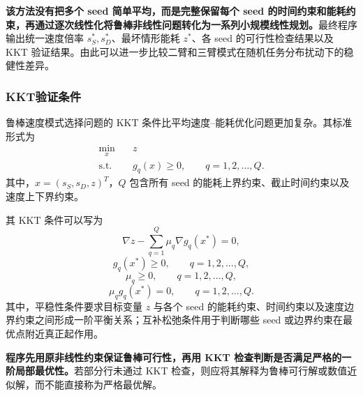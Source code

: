 \textbf{该方法没有把多个 seed 简单平均，而是完整保留每个 seed 的时间约束和能耗约束，再通过逐次线性化将鲁棒非线性问题转化为一系列小规模线性规划。}最终程序输出统一速度倍率 $s_S^{*},s_D^{*}$、最坏情形能耗 $z^{*}$、各 seed 的可行性检查结果以及 KKT 验证结果。由此可以进一步比较二臂和三臂模式在随机任务分布扰动下的稳健性差异。


\subsubsection{KKT验证条件}

鲁棒速度模式选择问题的 KKT 条件比平均速度--能耗优化问题更加复杂。其标准形式为
\[
\begin{aligned}
    \min_x\quad & z\\
    \text{s.t.}\quad & g_q(x)\geq 0,\qquad q=1,2,\ldots,Q.
\end{aligned}
\]
其中，$x=(s_S,s_D,z)^T$，$Q$ 包含所有 seed 的能耗上界约束、截止时间约束以及速度上下界约束。

其 KKT 条件可以写为
\[
\nabla z-\sum_{q=1}^{Q}\mu_q\nabla g_q(x^*)=0,
\]
\[
g_q(x^*)\geq 0,\qquad q=1,2,\ldots,Q,
\]
\[
\mu_q\geq 0,\qquad q=1,2,\ldots,Q,
\]
\[
\mu_q g_q(x^*)=0,\qquad q=1,2,\ldots,Q.
\]
其中，平稳性条件要求目标变量 $z$ 与各个 seed 的能耗约束、时间约束以及速度边界约束之间形成一阶平衡关系；互补松弛条件用于判断哪些 seed 或边界约束在最优点附近真正起作用。

\textbf{程序先用原非线性约束保证鲁棒可行性，再用 KKT 检查判断是否满足严格的一阶局部最优性。}若部分行未通过 KKT 检查，则应将其解释为鲁棒可行解或数值近似解，而不能直接称为严格最优解。
